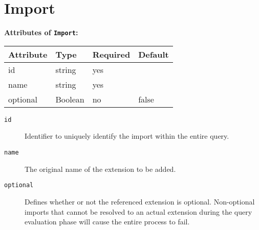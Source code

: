 \documentclass[11pt,a4paper]{report}
\newcommand{\iqlType}[1]{\texttt{\iqlns#1}}
\newenvironment{attributes}[1]{
	\noindent\textbf{Attributes of #1:}\newline\medskip
	\begin{tabular}{|p{0.3\textwidth}|p{0.20\textwidth}|p{0.20\textwidth}|p{0.17\textwidth}|}
		\hline
		\textbf{Attribute} & \textbf{Type} & \textbf{Required} & \textbf{Default} \\ 
		\hline
		\hline
	}{
	\end{tabular}
}
\newcommand{\attribute}[4]{
	#1 & #2 & #3 & #4 \\
	\hline
}
\begin{document}
\section{Import}
\label{sec:json-ld-import}
\begin{attributes}{\iqlType{Import}}
	\attribute{id}{string}{yes}{}
	\attribute{name}{string}{yes}{}
	\attribute{optional}{Boolean}{no}{false}
\end{attributes}
\begin{description}
	\item[\iqlType{id}] Identifier to uniquely identify the import within the entire query.
	\item[\iqlType{name}] The original name of the extension to be added.
	\item[\iqlType{optional}] Defines whether or not the referenced extension is optional. 	Non-optional imports that cannot be resolved to an actual extension during the query evaluation phase will cause the entire process to fail.
\end{description}

\end{document}
